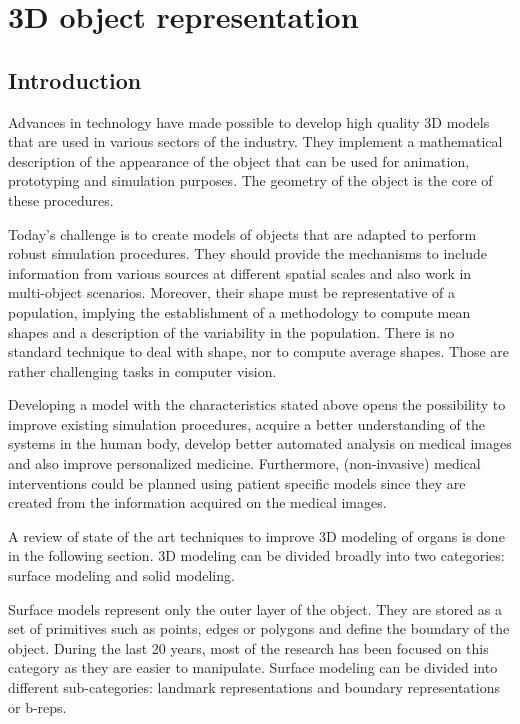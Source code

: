 
\graphicspath{{ChapterSrep/images/}}
\chapter{3D object representation}
\label{chapter:3DModels}

\section{Introduction}
\label{sec:3DModels}

Advances in technology have made possible to 
develop high quality 3D models that are used in various
sectors of the industry.
They implement a mathematical description of the appearance of the object
that can be used for animation, prototyping and simulation purposes. 
The geometry of the object is the core of these procedures.

Today's challenge is to create models of objects that are adapted 
to perform robust simulation procedures. 
They should provide the mechanisms to include information from 
various sources at different spatial scales and
also work in multi-object scenarios.
Moreover, their shape must be representative of a population, 
implying the establishment of a methodology to compute mean shapes 
and a description of the variability in the population. 
There is no standard technique to 
deal with shape, nor to compute average shapes.
Those are rather challenging tasks in computer vision.

Developing a model with the characteristics stated above 
opens the possibility to improve existing simulation procedures,
acquire a better understanding of the systems in the human body,
develop better automated analysis on medical images and
also improve personalized medicine.
Furthermore, (non-invasive) medical interventions could be planned using
patient specific models since they are created from 
the information acquired on the medical images.

A review of state of the art techniques to improve 3D modeling of organs
is done in the following section. 3D modeling can be divided broadly 
into two categories: surface modeling and solid modeling.

Surface models represent only the outer layer of the object. They are stored 
as a set of primitives such as points, edges or polygons and define the boundary of the object.
During the last 20 years, most of the research has been focused on this category as they are easier to manipulate.
Surface modeling can be divided into different sub-categories: landmark representations and
boundary representations or b-reps. 

